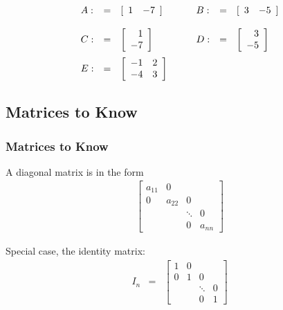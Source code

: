 {\begin{frame}
{        \begin{eqnarray*}
          \begin{array}{lcl@{\hspace{3em}}lcl}     
            A: &  = &  [\begin{array}{rr}  1 & -7\end{array}]  &
            B: &  = & [\begin{array}{rr}  3 & -5\end{array}] \\ [12pt]
            C: &  = & \vecTwo{1}{-7} &
            D: &  = & \vecTwo{3}{-5}\\[12pt]
            E: &  = & \arrayTwo{-1}{2}{-4}{3}
          \end{array}
        \end{eqnarray*}

       \vfill

     }\fi

    \vfill
    \vfill
    \vfill

\end{frame}

}

\subsection{Matrices to Know}

\begin{frame}
  \frametitle{Matrices to Know}

  A diagonal matrix is in the form
  \begin{eqnarray*}
    \left[
      \begin{array}{rrrr}
        a_{11} & 0 & \\
        0 & a_{22} & 0 \\
        & & \ddots & 0\\
        & & 0 & a_{nn}
      \end{array}
    \right]
  \end{eqnarray*}

  Special case, the identity matrix:
  \begin{eqnarray*}
    I_n & = & 
    \left[
      \begin{array}{rrrr}
        1 & 0 & \\
        0 & 1 & 0 \\
        & & \ddots & 0 \\
        & & 0 & 1
      \end{array}
    \right]
  \end{eqnarray*}

\end{frame}

